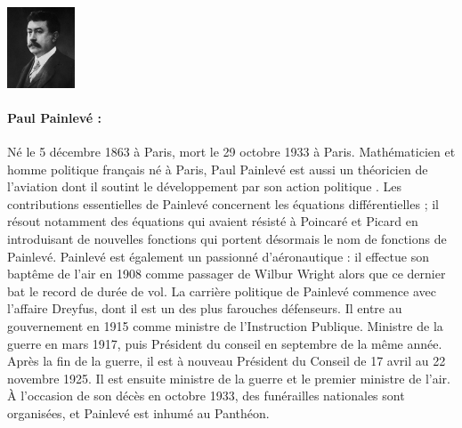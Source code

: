 \begin{minipage}{0.2\linewidth}
\begin{center}\includegraphics[width=2cm]{images/painleve.jpg}\end{center}
\end{minipage}
\begin{minipage}{0.8\linewidth}
\small{\paragraph*{Paul Painlevé :}Né le 5 décembre 1863 à Paris, mort le 29 octobre 1933 à Paris. Mathématicien et homme politique français né à Paris, Paul Painlevé est aussi un théoricien de l'aviation dont il soutint le développement par son action politique \cite{borel1911aviation}. Les contributions essentielles de Painlevé concernent les équations différentielles ; il résout notamment des équations qui avaient résisté à Poincaré et Picard en introduisant de nouvelles fonctions qui portent désormais le nom de fonctions de Painlevé. Painlevé est également un passionné d'aéronautique : il effectue son baptême de l'air en 1908 comme passager de Wilbur Wright alors que ce dernier bat le record de durée de vol. La carrière politique de Painlevé commence avec l'affaire Dreyfus, dont il est un des plus farouches défenseurs. Il entre au gouvernement en 1915 comme ministre de l'Instruction Publique. Ministre de la guerre en mars 1917, puis Président du conseil en septembre de la même année. Après la fin de la guerre, il est à nouveau Président du Conseil de 17 avril au 22 novembre 1925. Il est ensuite ministre de la guerre et le premier ministre de l'air. À l'occasion de son décès en octobre 1933, des funérailles nationales sont organisées, et Painlevé est inhumé au Panthéon.}
\end{minipage}
\vfill